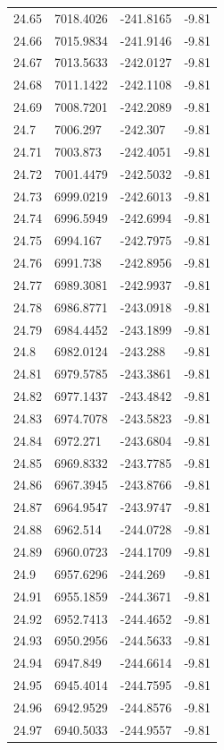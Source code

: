 \begin{table}[H]
\begin{tabular}{llll}
24.65 & 7018.4026 & -241.8165 & -9.81 \\
24.66 & 7015.9834 & -241.9146 & -9.81 \\
24.67 & 7013.5633 & -242.0127 & -9.81 \\
24.68 & 7011.1422 & -242.1108 & -9.81 \\
24.69 & 7008.7201 & -242.2089 & -9.81 \\
24.7 & 7006.297 & -242.307 & -9.81 \\
24.71 & 7003.873 & -242.4051 & -9.81 \\
24.72 & 7001.4479 & -242.5032 & -9.81 \\
24.73 & 6999.0219 & -242.6013 & -9.81 \\
24.74 & 6996.5949 & -242.6994 & -9.81 \\
24.75 & 6994.167 & -242.7975 & -9.81 \\
24.76 & 6991.738 & -242.8956 & -9.81 \\
24.77 & 6989.3081 & -242.9937 & -9.81 \\
24.78 & 6986.8771 & -243.0918 & -9.81 \\
24.79 & 6984.4452 & -243.1899 & -9.81 \\
24.8 & 6982.0124 & -243.288 & -9.81 \\
24.81 & 6979.5785 & -243.3861 & -9.81 \\
24.82 & 6977.1437 & -243.4842 & -9.81 \\
24.83 & 6974.7078 & -243.5823 & -9.81 \\
24.84 & 6972.271 & -243.6804 & -9.81 \\
24.85 & 6969.8332 & -243.7785 & -9.81 \\
24.86 & 6967.3945 & -243.8766 & -9.81 \\
24.87 & 6964.9547 & -243.9747 & -9.81 \\
24.88 & 6962.514 & -244.0728 & -9.81 \\
24.89 & 6960.0723 & -244.1709 & -9.81 \\
24.9 & 6957.6296 & -244.269 & -9.81 \\
24.91 & 6955.1859 & -244.3671 & -9.81 \\
24.92 & 6952.7413 & -244.4652 & -9.81 \\
24.93 & 6950.2956 & -244.5633 & -9.81 \\
24.94 & 6947.849 & -244.6614 & -9.81 \\
24.95 & 6945.4014 & -244.7595 & -9.81 \\
24.96 & 6942.9529 & -244.8576 & -9.81 \\
24.97 & 6940.5033 & -244.9557 & -9.81 \\

\end{tabular}
\end{table}
